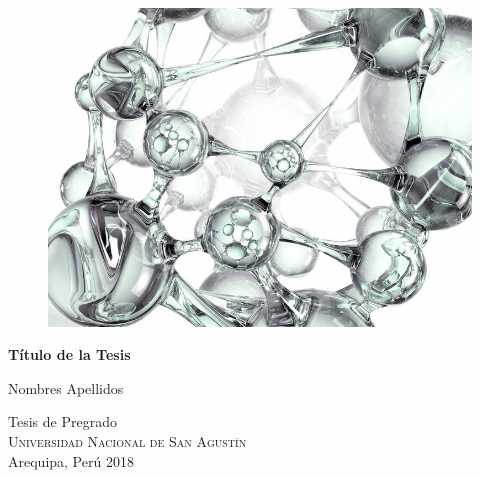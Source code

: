 
\begin{titlepage}
			
\addtolength{\voffset}{2cm}

\begin{figure}[H]
\centering
\vspace{2cm}	%
\includegraphics[width=0.9\linewidth]{figure/cluster.jpg}
\end{figure}

\mbox{}
\begin{center}
 \renewcommand{\familydefault}{\sfdefault} \normalfont %
\textbf{{\Huge Título de la Tesis}} 	\\[0.5cm]
\end{center}



{\Large Nombres Apellidos} \setlength{\parskip}{2.9cm}

Tesis de Pregrado \\
\textsc{Universidad Nacional de San Agust\'in} \\
Arequipa, Per\'u 2018

\renewcommand{\familydefault}{\rmdefault} \normalfont %
\end{titlepage}


